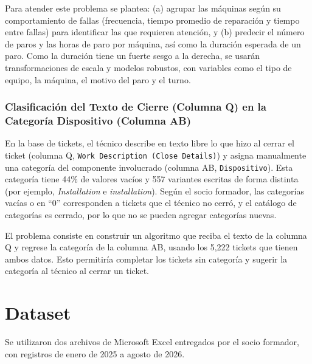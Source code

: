 \documentclass[conference]{IEEEtran}
\begin{document}
Para atender este problema se plantea: (a) agrupar las máquinas según su comportamiento de fallas (frecuencia, tiempo promedio de reparación y tiempo entre fallas) para identificar las que requieren atención, y (b) predecir el número de paros y las horas de paro por máquina, así como la duración esperada de un paro. Como la duración tiene un fuerte sesgo a la derecha, se usarán transformaciones de escala y modelos robustos, con variables como el tipo de equipo, la máquina, el motivo del paro y el turno.

\subsubsection{Clasificación del Texto de Cierre (Columna Q) en la Categoría Dispositivo (Columna AB)}
En la base de tickets, el técnico describe en texto libre lo que hizo al cerrar el ticket (columna Q, \texttt{Work Description (Close Details)}) y asigna manualmente una categoría del componente involucrado (columna AB, \texttt{Dispositivo}). Esta categoría tiene 44\% de valores vacíos y 557 variantes escritas de forma distinta (por ejemplo, \textit{Installation} e \textit{installation}). Según el socio formador, las categorías vacías o en ``0'' corresponden a tickets que el técnico no cerró, y el catálogo de categorías es cerrado, por lo que no se pueden agregar categorías nuevas.

El problema consiste en construir un algoritmo que reciba el texto de la columna Q y regrese la categoría de la columna AB, usando los 5,222 tickets que tienen ambos datos. Esto permitiría completar los tickets sin categoría y sugerir la categoría al técnico al cerrar un ticket.

\section{Dataset}
Se utilizaron dos archivos de Microsoft Excel entregados por el socio formador, con registros de enero de 2025 a agosto de 2026.
\end{document}

